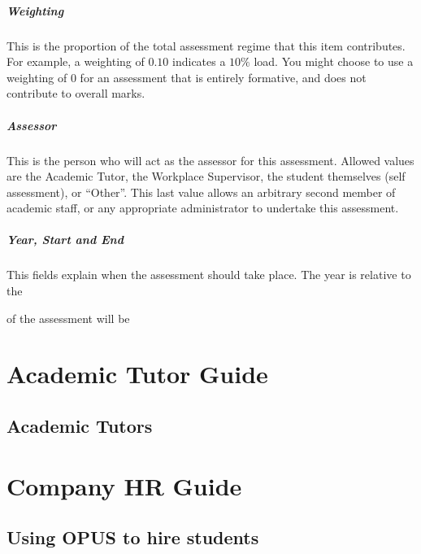 \documentclass[12 pt]{book}
\begin{document}
\subsubsection{Weighting}

This is the proportion of the total assessment regime that this item
contributes. For example, a weighting of $0.10$ indicates a $10\%$ load.
You might choose to use a weighting of $0$ for an assessment that is
entirely formative, and does not contribute to overall marks.

\subsubsection{Assessor}

This is the person who will act as the assessor for this assessment.
Allowed values are the Academic Tutor, the Workplace Supervisor, the
student themselves (self assessment), or ``Other''. This last value
allows an arbitrary second member of academic staff, or any appropriate
administrator to undertake this assessment.

\subsubsection{Year, Start and End}

This fields explain when the assessment should take place. The year is
relative to the

 of the assessment will be




%
%
%

\part{Academic Tutor Guide}

\chapter{Academic Tutors}

\part{Company HR Guide}

\chapter{Using OPUS to hire students}


\end{document}
